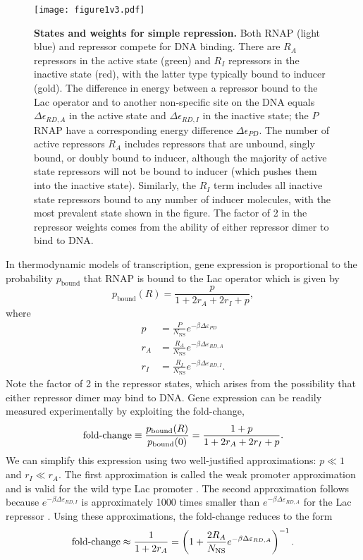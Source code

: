 \begin{figure}[h]
	\centering \texttt{[image: figure1v3.pdf]}
	\caption{{\bf States and weights for simple repression.} Both RNAP (light blue)
		and repressor compete for DNA binding. There are $R_A$ repressors in the active
		state (green) and $R_I$ repressors in the inactive state (red), with the latter
		type typically bound to inducer (gold). The difference in energy between a
		repressor bound to the Lac operator and to another non-specific site on the DNA
		equals $\Delta\epsilon_{RD,A}$ in the active state and $\Delta\epsilon_{RD,I}$
		in the inactive state; the $P$ RNAP have a corresponding energy difference
		$\Delta\epsilon_{PD}$. The number of active repressors $R_A$ includes
		repressors that are unbound, singly bound, or doubly bound to inducer, although
		the majority of active state repressors will not be bound to inducer (which
		pushes them into the inactive state). Similarly, the $R_I$ term includes all
		inactive state repressors bound to any number of inducer molecules, with the
		most prevalent state shown in the figure. The factor of 2 in the repressor
		weights comes from the ability of either repressor dimer to bind to DNA. }
	\label{figpolymeraseRepressorStates}
\end{figure}

In thermodynamic models of transcription, gene expression is proportional to the
probability $p_{\text{bound}}$ that RNAP is bound to the Lac operator which is
given by
\begin{equation}\label{eq2}
p_{\text{bound}}(R)=\frac{p}{1+2r_A+2r_I+p},
\end{equation}
where
\begin{align}
p &= \frac{P}{N_{\text{NS}}}e^{-\beta  \Delta\varepsilon_{PD}} \\
r_A &= \frac{R_A}{N_{\text{NS}}}e^{-\beta \Delta\varepsilon_{RD,A}} \\
r_I &= \frac{R_I}{N_{\text{NS}}}e^{-\beta  \Delta\varepsilon_{RD,I}}.
\end{align}
Note the factor of 2 in the repressor states, which arises from the possibility
that either repressor dimer may bind to DNA. Gene expression can be readily
measured experimentally by exploiting the fold-change,
\begin{equation}\label{eq3}
\operatorname{fold-change}\equiv \frac{p_{\text{bound}}(R)}{p_{\text{bound}}(0)}=\frac{1+p}{1+2r_A+2r_I+p}.
\end{equation}
We can simplify this expression using two well-justified approximations: \(p\ll
1\) and \(r_I\ll r_A\). The first approximation is called the weak promoter
approximation and is valid for the wild type Lac promoter \cite{Brewster2012}.
The second approximation follows because $e^{-\beta  \Delta\varepsilon_{RD,I}}$ is
approximately 1000 times smaller than $e^{-\beta \Delta\varepsilon_{RD,A}}$ for
the Lac repressor \cite{Daber2011a}. Using these approximations, the fold-change
reduces to the form
\begin{equation}\label{eq4}
\operatorname{fold-change}\approx \frac{1}{1+2r_A}=\left(1+\frac{2R_A}{N_{\text{NS}}}e^{-\beta  \Delta\varepsilon_{RD,A}}\right)^{-1}.
\end{equation}

